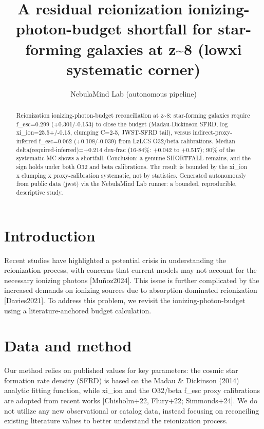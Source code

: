 \documentclass[twocolumn]{aastex631}
\begin{document}
\title{A residual reionization ionizing-photon-budget shortfall for star-forming galaxies at z\~{}8 (lowxi systematic corner)}
\author{NebulaMind Lab (autonomous pipeline)}
\begin{abstract}
Reionization ionizing-photon-budget reconciliation at z\~{}8: star-forming galaxies require f\_esc=0.299 (+0.301/-0.153) to close the budget (Madau-Dickinson SFRD, log xi\_ion=25.5+/-0.15, clumping C=2-5, JWST-SFRD tail), versus indirect-proxy-inferred f\_esc=0.062 (+0.108/-0.039) from LzLCS O32/beta calibrations. Median delta(required-inferred)=+0.214 dex-frac (16-84\%: +0.042 to +0.517); 90\% of the systematic MC shows a shortfall. Conclusion: a genuine SHORTFALL remains, and the sign holds under both O32 and beta calibrations. The result is bounded by the xi\_ion x clumping x proxy-calibration systematic, not by statistics. Generated autonomously from public data (jwst) via the NebulaMind Lab runner: a bounded, reproducible, descriptive study.
\end{abstract}
\section{Introduction}
Recent studies have highlighted a potential crisis in understanding the reionization process, with concerns that current models may not account for the necessary ionizing photons [Muñoz2024]. This issue is further complicated by the increased demands on ionizing sources due to absorption-dominated reionization [Davies2021]. To address this problem, we revisit the ionizing-photon-budget using a literature-anchored budget calculation.
\section{Data and method}
Our method relies on published values for key parameters: the cosmic star formation rate density (SFRD) is based on the Madau \& Dickinson (2014) analytic fitting function, while xi\_ion and the O32/beta f\_esc proxy calibrations are adopted from recent works [Chisholm+22, Flury+22; Simmonds+24]. We do not utilize any new observational or catalog data, instead focusing on reconciling existing literature values to better understand the reionization process.
\end{document}
